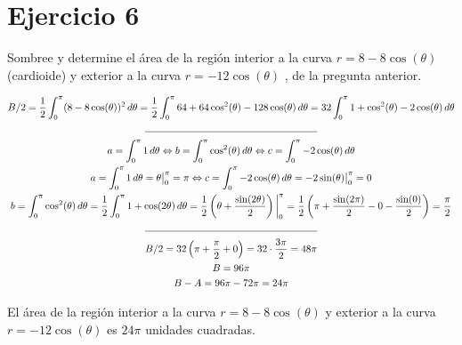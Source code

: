 \section*{Ejercicio 6}
\noindent Sombree y determine el área de la región interior a la curva \(r = 8 - 8\cos(\theta)\) (cardioide) y exterior a la curva \(r = -12\cos(\theta)\) , de la pregunta anterior.

\begin{gather*}
  B / 2 = \frac{1}{2} \int_{0}^{\pi} (8 - 8\cos(\theta))^2 \, d\theta %
    = \frac{1}{2} \int_{0}^{\pi} 64 + 64\cos^2(\theta) - 128\cos(\theta) \, d\theta %
    = 32 \int_{0}^{\pi} 1 + \cos^2(\theta) - 2\cos(\theta) \, d\theta \\
  \rule{0.5\textwidth}{0.4pt} \\
  a = \int_{0}^{\pi} 1 \, d\theta \Leftrightarrow %
    b = \int_{0}^{\pi} \cos^2(\theta) \, d\theta \Leftrightarrow %
    c = \int_{0}^{\pi} -2\cos(\theta) \, d\theta \\
  a = \int_{0}^{\pi} 1 \, d\theta = \theta \big|_{0}^{\pi} = \pi \Leftrightarrow %
    c = \int_{0}^{\pi} -2\cos(\theta) \, d\theta = -2 \sin(\theta) \big|_{0}^{\pi} = 0 \\
  b = \int_{0}^{\pi} \cos^2(\theta) \, d\theta %
    = \frac{1}{2} \int_{0}^{\pi} 1 + \cos(2\theta) \, d\theta %
    = \frac{1}{2} \left(\theta + \frac{\sin(2\theta)}{2}\right) \bigg|_{0}^{\pi} %
    = \frac{1}{2} \left(\pi + \frac{\sin(2\pi)}{2} - 0 - \frac{\sin(0)}{2}\right) %
    = \frac{\pi}{2} \\
  \rule{0.5\textwidth}{0.4pt} \\
  B / 2 = 32 \left(\pi + \frac{\pi}{2} + 0\right) = 32 \cdot \frac{3\pi}{2} = 48\pi \\
  B = 96\pi \\
  B - A = 96\pi - 72\pi = 24\pi
\end{gather*}

\noindent El área de la región interior a la curva \(r = 8 - 8\cos(\theta)\) y exterior a la curva \(r = -12\cos(\theta)\) es \(24\pi\) unidades cuadradas.

\newpage